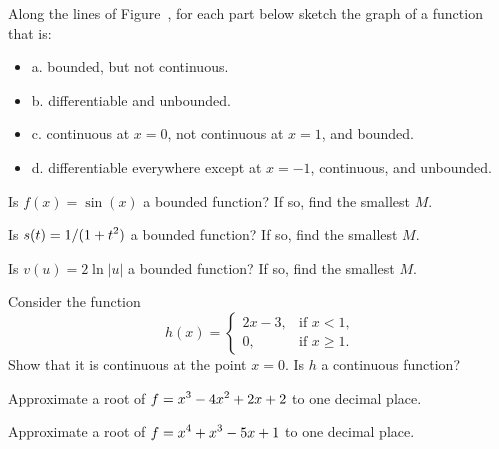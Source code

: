 \begin{exercises}

\exercise Along the lines of Figure~,
for each part below sketch the
 graph of a function that is:

\begin{itemize} %

  \item{a.} bounded, but not continuous.

  \item{b.} differentiable and unbounded.

  \item{c.} continuous at $x=0$, not continuous at $x=1$, and bounded.
  
  \item{d.} differentiable everywhere except at $x=-1$, continuous, and unbounded.

 \end{itemize}

\exercise Is $f(x)=\sin(x)$ a bounded function?  If so, find the smallest $M$.

\exercise Is $\displaystyle s(t) = 1/(1+t^2)$ a bounded function?  If so, find the
smallest $M$.

 \exercise Is $v(u) = 2\ln|u|$ a bounded function?  If so, find the smallest $M$.

 \exercise Consider the function 
$$h(x) = \begin{cases}
2x - 3, & \mbox{if $x<1$,} \\
0, & \mbox{if $x\geq 1$.}
\end{cases}$$
Show that it is continuous at the point $x=0$.  Is $h$ a continuous function?

\exercise
Approximate a root of $\displaystyle f=x^3-4x^2+2x+2$ to one decimal place.

\exercise
Approximate a root of $\displaystyle f=x^4+x^3-5x+1$ to one decimal place.

\end{exercises}
